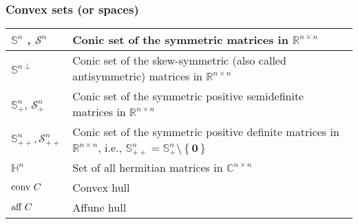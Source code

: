\subsubsection{Convex sets (or spaces)}
\begin{xltabular}{\textwidth}{XX}
	\(\mathbb{S}^{n}\) \cite{dattorroConvexOptimizationEuclidean2010}, \(\mathcal{S}^{n}\) \cite{boydConvexOptimization2004} & Conic set of the symmetric matrices in \(\mathbb{R}^{n\times n}\)                                                                                                                                              \\ \hline
	\(\mathbb{S}^{n\perp}\) \cite{dattorroConvexOptimizationEuclidean2010}                                                   & Conic set of the skew-symmetric (also called antisymmetric) matrices in \(\mathbb{R}^{n\times n}\) \\ \hline
	\(\mathbb{S}_{+}^{n}\), \(\mathcal{S}_{+}^{n}\)                                                                          & Conic set of the symmetric positive semidefinite matrices in \(\mathbb{R}^{n\times n}\) \cite{boydConvexOptimization2004}                                                                                      \\ \hline
	\(\mathbb{S}_{++}^{n}, \mathcal{S}_{++}^{n}\)                                                                            & Conic set of the symmetric positive definite matrices in \(\mathbb{R}^{n\times n}\), i.e., \(\mathbb{S}_{++}^{n} = \mathbb{S}_{+}^{n}\setminus \left\{ \mathbf{0} \right\}\) \cite{boydConvexOptimization2004} \\ \hline
	\(\mathbb{H}^{n}\)                                                                                                       & Set of all hermitian matrices in \(\mathbb{C}^{n\times n}\)                                                                                                                                                    \\ \hline
	\(\textnormal{conv } C\)                                                                                                 & Convex hull                                                                                                                                                                                                    \\ \hline
	\(\textnormal{aff } C\)                                                                                                  & Affune hull                                                                                                                                                                                                    \\ \hline

\end{xltabular}
